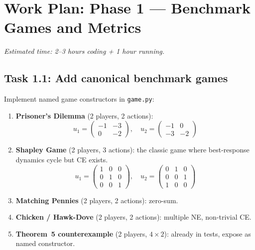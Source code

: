 \documentclass[11pt]{article}
\begin{document}
\section{Work Plan: Phase 1 --- Benchmark Games and Metrics}

\textit{Estimated time: 2--3 hours coding + 1 hour running.}

\subsection{Task 1.1: Add canonical benchmark games}

Implement named game constructors in \texttt{game.py}:

\begin{enumerate}[nosep]
    \item \textbf{Prisoner's Dilemma} (2 players, 2 actions):
    \[
    u_1 = \begin{pmatrix} -1 & -3 \\ 0 & -2 \end{pmatrix}, \quad
    u_2 = \begin{pmatrix} -1 & 0 \\ -3 & -2 \end{pmatrix}
    \]

    \item \textbf{Shapley Game} (2 players, 3 actions): the classic game where best-response dynamics cycle but CE exists.
    \[
    u_1 = \begin{pmatrix} 1 & 0 & 0 \\ 0 & 1 & 0 \\ 0 & 0 & 1 \end{pmatrix}, \quad
    u_2 = \begin{pmatrix} 0 & 1 & 0 \\ 0 & 0 & 1 \\ 1 & 0 & 0 \end{pmatrix}
    \]

    \item \textbf{Matching Pennies} (2 players, 2 actions): zero-sum.

    \item \textbf{Chicken / Hawk-Dove} (2 players, 2 actions): multiple NE, non-trivial CE.

    \item \textbf{Theorem~5 counterexample} (2 players, $4 \times 2$): already in tests, expose as named constructor.
\end{enumerate}
\end{document}

